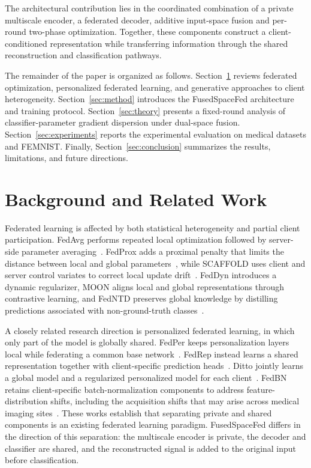 \documentclass[twoside]{article}
\theoremstyle{thmstyleone}%
\theoremstyle{thmstyletwo}%
\theoremstyle{thmstylethree}%
\begin{document}
The architectural contribution lies in the coordinated combination of a private multiscale encoder, a federated decoder, additive input-space fusion and per-round two-phase optimization. Together, these components construct a client-conditioned representation while transferring information through the shared reconstruction and classification pathways.

The remainder of the paper is organized as follows. Section~\ref{sec:background} reviews federated optimization, personalized federated learning, and generative approaches to client heterogeneity. Section~\ref{sec:method} introduces the FusedSpaceFed architecture and training protocol. Section~\ref{sec:theory} presents a fixed-round analysis of classifier-parameter gradient dispersion under dual-space fusion. Section~\ref{sec:experiments} reports the experimental evaluation on medical datasets and FEMNIST. Finally, Section~\ref{sec:conclusion} summarizes the results, limitations, and future directions.



\section{Background and Related Work}\label{sec:background}

Federated learning is affected by both statistical heterogeneity and partial client participation. FedAvg performs repeated local optimization followed by server-side parameter averaging~\cite{mcmahan2017communication}. FedProx adds a proximal penalty that limits the distance between local and global parameters~\cite{li2018federated}, while SCAFFOLD uses client and server control variates to correct local update drift~\cite{karimireddy2020scaffold}. FedDyn introduces a dynamic regularizer, MOON aligns local and global representations through contrastive learning, and FedNTD preserves global knowledge by distilling predictions associated with non-ground-truth classes~\cite{acar2021feddyn,li2021moon,lee2022preservation}.

A closely related research direction is personalized federated learning, in which only part of the model is globally shared. FedPer keeps personalization layers local while federating a common base network~\cite{arivazhagan2019fedper}. FedRep instead learns a shared representation together with client-specific prediction heads~\cite{collins2021fedrep}. Ditto jointly learns a global model and a regularized personalized model for each client~\cite{li2021ditto}. FedBN retains client-specific batch-normalization components to address feature-distribution shifts, including the acquisition shifts that may arise across medical imaging sites~\cite{li2021fedbn}. These works establish that separating private and shared components is an existing federated learning paradigm. FusedSpaceFed differs in the direction of this separation: the multiscale encoder is private, the decoder and classifier are shared, and the reconstructed signal is added to the original input before classification.
\end{document}
